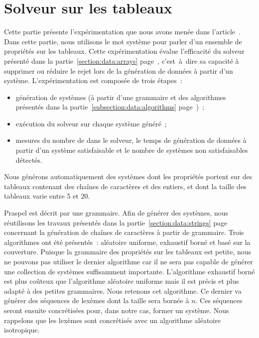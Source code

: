 \section{Solveur sur les tableaux}
\label{section:experimentation:solver}

Cette partie présente l'expérimentation que nous avons menée dans
l'article~. Dans cette partie, nous utilisons le mot
{\strong système} pour parler d'un ensemble de propriétés sur les tableaux.
Cette expérimentation évalue l'efficacité du solveur présenté dans la
partie~\ref{section:data:arrays} page~\pageref{section:data:arrays},
c'est~à~dire sa capacité à supprimer ou réduire le rejet lors de la génération
de données à partir d'un système. L'expérimentation est composée de trois
étapes~:
%
\begin{itemize}

\item génération de systèmes (à partir d'une grammaire et des algorithmes
présentés dans la partie~\ref{subsection:data:algorithms}
page~\pageref{subsection:data:algorithms})~;

\item exécution du solveur sur chaque système généré~;

\item mesures du nombre de  dans le solveur, le temps de
génération de données à partir d'un système satisfaisable et le nombre de
systèmes non satisfaisables détectés.

\end{itemize}
%
Nous générons automatiquement des systèmes dont les propriétés portent sur des
tableaux contenant des chaînes de caractères et des entiers, et dont la taille
des tableaux varie entre 5 et 20.

Praspel est décrit par une grammaire. Afin de générer des systèmes, nous
réutilisons les travaux présentés dans la partie~\ref{section:data:strings}
page~\pageref{section:data:strings} concernant la génération de chaînes de
caractères à partir de grammaire. Trois algorithmes ont été présentés~:
aléatoire uniforme, exhaustif borné et basé sur la couverture. Puisque la
grammaire des propriétés sur les tableaux est petite, nous ne pouvons pas
utiliser le dernier algorithme car il ne sera pas capable de générer une
collection de systèmes suffisamment importante. L'algorithme exhaustif borné est
plus coûteux que l'algorithme aléatoire uniforme mais il est précis et plus
adapté à des petites grammaires. Nous retenons cet algorithme. Ce dernier va
générer des séquences de lexèmes dont la taille sera bornée à $n$. Ces séquences
seront ensuite concrétisées pour, dans notre cas, former un système. Nous
rappelons que les lexèmes sont concrétisés avec un algorithme aléatoire
isotropique.

